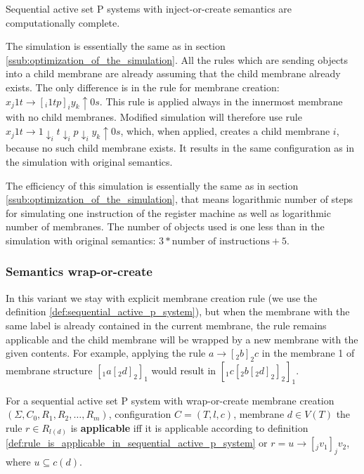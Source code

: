 
    \begin{veta}
      Sequential active set P systems with inject-or-create semantics are computationally complete.
    \end{veta}

    \begin{dokaz}
      The simulation is essentially the same as in section \ref{ssub:optimization_of_the_simulation}. All the rules which are sending objects into a child membrane are already assuming that the child membrane already exists. The only difference is in the rule for membrane creation: $x_j1t \rightarrow [_i 1tp]_iy_k\uparrow 0s$. This rule is applied always in the innermost membrane with no child membranes. Modified simulation will therefore use rule $x_j1t \rightarrow 1\downarrow_i t\downarrow_i p\downarrow_i y_k\uparrow 0s$, which, when applied, creates a child membrane $i$, because no such child membrane exists. It results in the same configuration as in the simulation with original semantics. 
    \end{dokaz}

    The efficiency of this simulation is essentially the same as in section \ref{ssub:optimization_of_the_simulation}, that means logarithmic number of steps for simulating one instruction of the register machine as well as logarithmic number of membranes. The number of objects used is one less than in the simulation with original semantics: $3 * \text{number of instructions} + 5$.


  \subsubsection{Semantics wrap-or-create} %
  \label{ssub:semantics_wrap_or_create}
    
    In this variant we stay with explicit membrane creation rule (we use the definition \ref{def:sequential_active_p_system}), but when the membrane with the same label is already contained in the current membrane, the rule remains applicable and the child membrane will be wrapped by a new membrane with the given contents. For example, applying the rule $a \rightarrow [_2 b ]_2 c$ in the membrane 1 of membrane structure $[_1 a [_2 d ]_2 ]_1$ would result in $[_1 c [_2 b [_2 d ]_2 ]_2 ]_1$.

    \begin{definition}
      For a sequential active set P system with wrap-or-create membrane creation $(\Sigma, C_0, R_1, R_2, \dots , R_m)$, configuration $C = (T, l, c)$, membrane $d\in V(T)$ the rule $r\in R_{l(d)}$ is {\bf applicable} iff it is applicable according to definition \ref{def:rule_is_applicable_in_sequential_active_p_system} or $r = u\rightarrow [_j v_1]_j v_2$, where $u\subseteq c(d)$.
    \end{definition}

